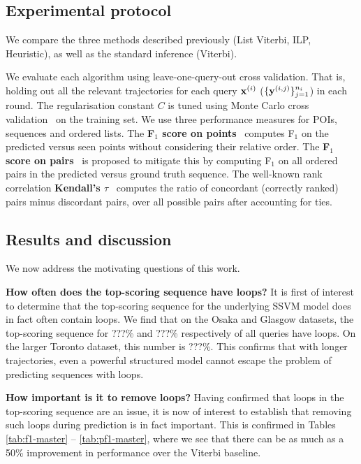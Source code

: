 %
\subsection{Experimental protocol}

We compare the three methods described previously ({\sc List Viterbi}, {\sc ILP}, {\sc Heuristic}),
as well as the standard inference ({\sc Viterbi}).

We evaluate each algorithm using leave-one-query-out cross validation.
That is, holding out all the relevant trajectories for each query $\mathbf{x}^{(i)}$ (\ie $\{\mathbf{y}^{(i,j)}\}_{j=1}^{n_i}$) in each round.
The regularisation constant $C$ is tuned using Monte Carlo cross validation~\cite{burman1989comparative} on the training set.
We use three performance measures for POIs, sequences and ordered lists.
The {\bf F$_1$ score on points}~\cite{ijcai15} computes F$_1$ on the predicted versus seen points
without considering their relative order.
The {\bf F$_1$ score on pairs}~\cite{cikm16paper} is proposed to mitigate this by computing F$_1$ on all ordered pairs in the predicted versus ground truth sequence. %
The well-known rank correlation {\bf Kendall's $\tau$}~\cite{agresti2010analysis}
computes the ratio of concordant (correctly ranked) pairs minus discordant pairs, over all possible pairs after accounting for ties.%


%
\subsection{Results and discussion}

We now address the motivating questions of this work.

\textbf{How often does the top-scoring sequence have loops?}
It is first of interest to determine that the top-scoring sequence for the underlying SSVM model does in fact often contain loops.
We find that on the Osaka and Glasgow datasets, the top-scoring sequence for ???\% and ???\% respectively of all queries have loops.
On the larger Toronto dataset, this number is ???\%.
This confirms that with longer trajectories, even a powerful structured model cannot escape the problem of predicting sequences with loops.

\textbf{How important is it to remove loops?}
Having confirmed that loops in the top-scoring sequence are an issue,
it is now of interest to establish that removing such loops during prediction is in fact important.
This is confirmed in Tables \ref{tab:f1-master} -- \ref{tab:pf1-master},
where we see that there can be as much as a 50\% improvement in performance over the {\sc Viterbi} baseline.

